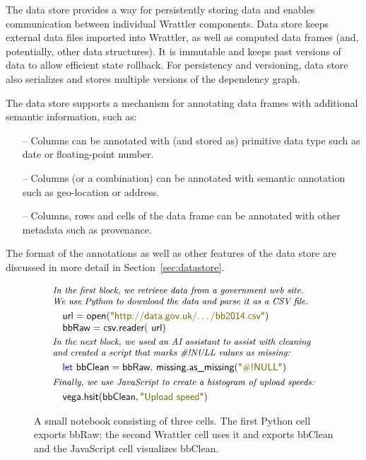 \documentclass[sigplan,preprint,10pt]{acmart}\settopmatter{printfolios=true,printccs=false,printacmref=false}
\newcommand{\str}[1]{\textnormal{\textcolor{strclr}{\sffamily "#1"}}}
\newcommand{\ident}[1]{\textnormal{\sffamily #1}}
\newcommand{\kvd}[1]{\textnormal{\textcolor{kvdclr}{\sffamily #1}}}
\begin{document}
The data store provides a way for persistently storing data and enables communication between
individual Wrattler components. Data store keeps external data files imported into Wrattler,
as well as computed data frames (and, potentially, other data structures). It is immutable
and keeps past versions of data to allow efficient state rollback. For persistency and versioning,
data store also serializes and stores multiple versions of the dependency graph.

The data store supports a mechanism for annotating data frames with additional semantic information, such as:
%
\begin{itemize}
\item[--] Columns can be annotated with (and stored as) primitive data type such as date or floating-point number.
\vspace{0.25em}
\item[--] Columns (or a combination) can be annotated with semantic annotation such as geo-location or address.
\vspace{-0.85em}
\item[--] Columns, rows and cells of the data frame can be annotated with other metadata such as provenance.
\end{itemize}

\noindent
The format of the annotations as well as other features of the data store are discussed in
more detail in Section~\ref{sec:datastore}.

\begin{figure}
\begin{equation*}
\begin{array}{l}
\textit{\small{In the first block, we retrieve data from a government web site.}}\\[-0.1em]
\textit{\small{We use Python to download the data and parse it as a CSV file.}}\\[0.3em]
\quad\ident{url}=\ident{open}(\str{http://data.gov.uk/\ldots/bb2014.csv})\\
\quad\ident{bbRaw}=\ident{csv.reader}(\ident{url})\\[0.2em]
\textit{\small{In the next block, we used an AI assistant to assist with cleaning}}\\[-0.1em]
\textit{\small{and created a script that marks \#!NULL values as missing:}}\\[0.3em]
\quad\kvd{let}~\ident{bbClean} = \ident{bbRaw}.\ident{missing}.\ident{as\_missing}(\str{\#!NULL})\\[0.3em]
\textit{\small{Finally, we use JavaScript to create a histogram of upload speeds:}}\\[0.3em]
\quad\ident{vega}.\ident{hsit}(\ident{bbClean}, \str{Upload speed})
\end{array}
\end{equation*}
\vspace{-0.5em}
\caption{\small{A small notebook consisting of three cells. The first Python cell exports
\ident{bbRaw}; the second Wrattler cell uses it and exports \ident{bbClean} and the
JavaScript cell visualizes \ident{bbClean}.}}
\label{fig:notebook}
\end{figure}
\end{document}
